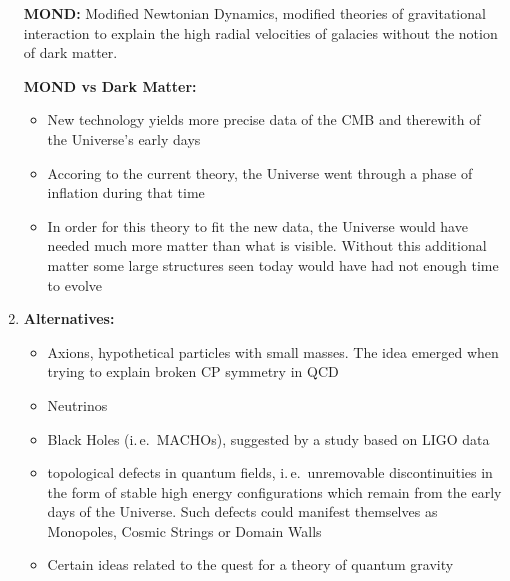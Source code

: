 \documentclass[11pt,a4paper]{scrartcl}
\newcommand{\ie}{i.\,e.}
\begin{document}
\begin{enumerate}[label=\textbf{\large(\alph*)}, itemsep=\baselineskip]
        \textbf{MOND:} Modified Newtonian Dynamics, modified theories of
        gravitational interaction to explain the high radial velocities of
        galacies without the notion of dark matter.

        \textbf{MOND vs Dark Matter:}
        \begin{itemize}
            \item New technology yields more precise data of the CMB and
                therewith of the Universe's early days
            \item Accoring to the current theory, the Universe went through a
                phase of inflation during that time
            \item In order for this theory to fit the new data, the Universe
                would have needed much more matter than what is visible.
                Without this additional matter some large structures seen today
                would have had not enough time to evolve
        \end{itemize}

\newpage
\item
        \textbf{Alternatives:}
        \begin{itemize}
            \item Axions, hypothetical particles with small masses. The idea
                emerged when trying to explain broken CP symmetry in QCD
            \item Neutrinos
            \item Black Holes (\ie~MACHOs), suggested by a study based on LIGO
                data
            \item topological defects in quantum fields, \ie~unremovable
                discontinuities in the form of stable high energy
                configurations which remain from the early days of the
                Universe. Such defects could manifest themselves as Monopoles,
                Cosmic Strings or Domain Walls
            \item Certain ideas related to the quest for a theory of quantum
                gravity
        \end{itemize}

\end{enumerate}
\end{document}
